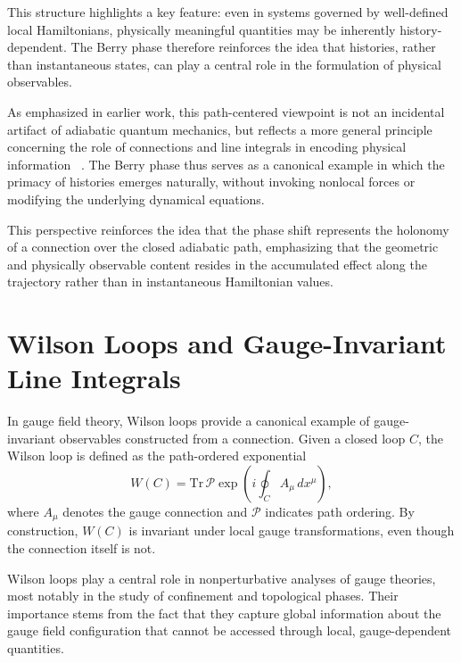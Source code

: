 \documentclass[%
 reprint,
 amsmath,amssymb,
 aps,
 prb,
]{revtex4-2}
\numberwithin{equation}{section}
\begin{document}
This structure highlights a key feature: even in systems governed by well-defined local Hamiltonians, physically meaningful quantities may be inherently history-dependent. The Berry phase therefore reinforces the idea that histories, rather than instantaneous states, can play a central role in the formulation of physical observables.

As emphasized in earlier work, this path-centered viewpoint is not an incidental artifact of adiabatic quantum mechanics, but reflects a more general principle concerning the role of connections and line integrals in encoding physical information ~\cite{hanamura17765409}. The Berry phase thus serves as a canonical example in which the primacy of histories emerges naturally, without invoking nonlocal forces or modifying the underlying dynamical equations.

This perspective reinforces the idea that the phase shift represents the holonomy of a connection over the closed adiabatic path, emphasizing that the geometric and physically observable content resides in the accumulated effect along the trajectory rather than in instantaneous Hamiltonian values.


\section{Wilson Loops and Gauge-Invariant Line Integrals}
\label{sec:wilson_loops_gauge_invariant}

In gauge field theory, Wilson loops provide a canonical example of gauge-invariant observables constructed from a connection. Given a closed loop $C$, the Wilson loop is defined as the path-ordered exponential
\begin{equation}
W(C) = \mathrm{Tr}\, \mathcal{P} \exp\left( i \oint_C A_\mu \, dx^\mu \right),
\end{equation}
where $A_\mu$ denotes the gauge connection and $\mathcal{P}$ indicates path ordering. By construction, $W(C)$ is invariant under local gauge transformations, even though the connection itself is not.

Wilson loops play a central role in nonperturbative analyses of gauge theories, most notably in the study of confinement and topological phases. Their importance stems from the fact that they capture global information about the gauge field configuration that cannot be accessed through local, gauge-dependent quantities.
\end{document}
